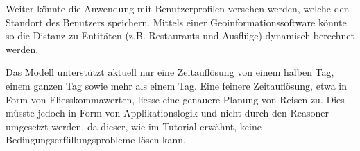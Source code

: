 Weiter könnte die Anwendung mit Benutzerprofilen versehen werden, welche den Standort des Benutzers speichern. Mittels einer Geoinformationssoftware könnte so die Distanz zu Entitäten (z.B. Restaurants und Ausflüge) dynamisch berechnet werden.

Das Modell unterstützt aktuell nur eine Zeitauflösung von einem halben Tag, einem ganzen Tag sowie mehr als einem Tag. Eine feinere Zeitauflösung, etwa in Form von Fliesskommawerten, liesse eine genauere Planung von Reisen zu. Dies müsste jedoch in Form von Applikationslogik und nicht durch den Reasoner umgesetzt werden, da dieser, wie im Tutorial erwähnt, keine Bedingungserfüllungsprobleme lösen kann.


